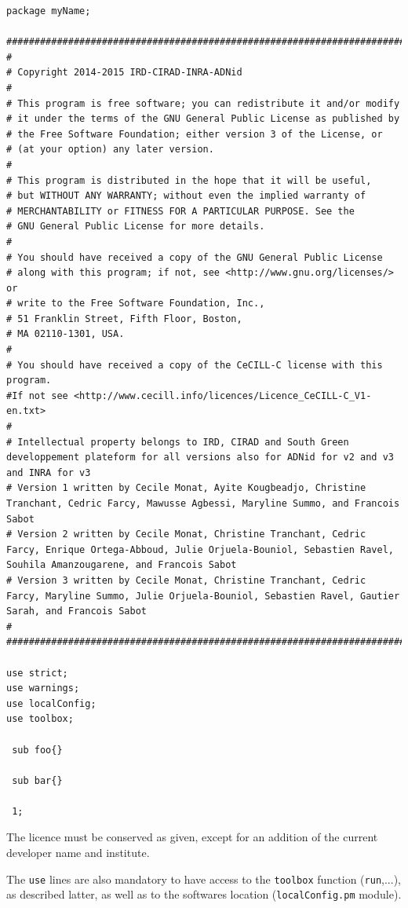 \documentclass[a4paper,10pt]{report}
\begin{document}
\begin{lstlisting}
package myName;

################################################################################################################################
#
# Copyright 2014-2015 IRD-CIRAD-INRA-ADNid
#
# This program is free software; you can redistribute it and/or modify
# it under the terms of the GNU General Public License as published by
# the Free Software Foundation; either version 3 of the License, or
# (at your option) any later version.
#
# This program is distributed in the hope that it will be useful,
# but WITHOUT ANY WARRANTY; without even the implied warranty of
# MERCHANTABILITY or FITNESS FOR A PARTICULAR PURPOSE. See the
# GNU General Public License for more details.
#
# You should have received a copy of the GNU General Public License
# along with this program; if not, see <http://www.gnu.org/licenses/> or
# write to the Free Software Foundation, Inc.,
# 51 Franklin Street, Fifth Floor, Boston,
# MA 02110-1301, USA.
#
# You should have received a copy of the CeCILL-C license with this program.
#If not see <http://www.cecill.info/licences/Licence_CeCILL-C_V1-en.txt>
#
# Intellectual property belongs to IRD, CIRAD and South Green developpement plateform for all versions also for ADNid for v2 and v3 and INRA for v3
# Version 1 written by Cecile Monat, Ayite Kougbeadjo, Christine Tranchant, Cedric Farcy, Mawusse Agbessi, Maryline Summo, and Francois Sabot
# Version 2 written by Cecile Monat, Christine Tranchant, Cedric Farcy, Enrique Ortega-Abboud, Julie Orjuela-Bouniol, Sebastien Ravel, Souhila Amanzougarene, and Francois Sabot
# Version 3 written by Cecile Monat, Christine Tranchant, Cedric Farcy, Maryline Summo, Julie Orjuela-Bouniol, Sebastien Ravel, Gautier Sarah, and Francois Sabot
#
################################################################################################################################

use strict;
use warnings;
use localConfig;
use toolbox;

 sub foo{}

 sub bar{}
 
 1;
 \end{lstlisting}

The licence must be conserved as given, except for an addition of the current developer name and institute.

The \texttt{use} lines are also mandatory to have access to the \texttt{toolbox} function (\texttt{run},...), as described latter, as well as to the softwares location (\texttt{localConfig.pm} module).
\end{document}
